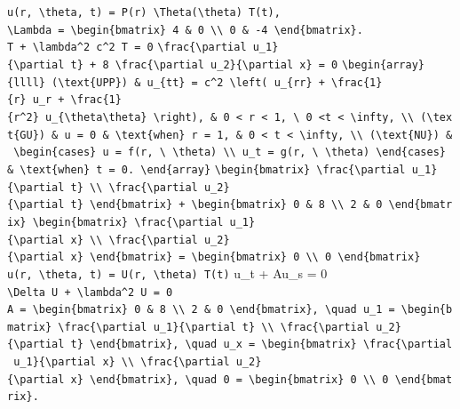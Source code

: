 \documentclass[
  ukrainian,
]{article}
\begin{document}
\texttt{u(r,\ \textbackslash{}theta,\ t)\ =\ P(r)\ \textbackslash{}Theta(\textbackslash{}theta)\ T(t),}
\texttt{\textbackslash{}Lambda\ =\ \textbackslash{}begin\{bmatrix\}\ 4\ \&\ 0\ \textbackslash{}\textbackslash{}\ 0\ \&\ -4\ \textbackslash{}end\{bmatrix\}.}
\texttt{T\textquotesingle{}\textquotesingle{}\ +\ \textbackslash{}lambda\^{}2\ c\^{}2\ T\ =\ 0}
\texttt{\textbackslash{}frac\{\textbackslash{}partial\ u\_1\}\{\textbackslash{}partial\ t\}\ +\ 8\ \textbackslash{}frac\{\textbackslash{}partial\ u\_2\}\{\textbackslash{}partial\ x\}\ =\ 0}
\texttt{\textbackslash{}begin\{array\}\{llll\}\ (\textbackslash{}text\{UPP\})\ \&\ u\_\{tt\}\ =\ c\^{}2\ \textbackslash{}left(\ u\_\{rr\}\ +\ \textbackslash{}frac\{1\}\{r\}\ u\_r\ +\ \textbackslash{}frac\{1\}\{r\^{}2\}\ u\_\{\textbackslash{}theta\textbackslash{}theta\}\ \textbackslash{}right),\ \&\ 0\ \textless{}\ r\ \textless{}\ 1,\ \textbackslash{}\ 0\ \textless{}t\ \textless{}\ \textbackslash{}infty,\ \textbackslash{}\textbackslash{}\ (\textbackslash{}text\{GU\})\ \&\ u\ =\ 0\ \&\ \textbackslash{}text\{when\}\ r\ =\ 1,\ \&\ 0\ \textless{}\ t\ \textless{}\ \textbackslash{}infty,\ \textbackslash{}\textbackslash{}\ (\textbackslash{}text\{NU\})\ \&\ \textbackslash{}begin\{cases\}\ u\ =\ f(r,\ \textbackslash{}\ \textbackslash{}theta)\ \textbackslash{}\textbackslash{}\ u\_t\ =\ g(r,\ \textbackslash{}\ \textbackslash{}theta)\ \textbackslash{}end\{cases\}\ \&\ \textbackslash{}text\{when\}\ t\ =\ 0.\ \textbackslash{}end\{array\}}
\texttt{\textbackslash{}begin\{bmatrix\}\ \textbackslash{}frac\{\textbackslash{}partial\ u\_1\}\{\textbackslash{}partial\ t\}\ \textbackslash{}\textbackslash{}\ \textbackslash{}frac\{\textbackslash{}partial\ u\_2\}\{\textbackslash{}partial\ t\}\ \textbackslash{}end\{bmatrix\}\ +\ \textbackslash{}begin\{bmatrix\}\ 0\ \&\ 8\ \textbackslash{}\textbackslash{}\ 2\ \&\ 0\ \textbackslash{}end\{bmatrix\}\ \textbackslash{}begin\{bmatrix\}\ \textbackslash{}frac\{\textbackslash{}partial\ u\_1\}\{\textbackslash{}partial\ x\}\ \textbackslash{}\textbackslash{}\ \textbackslash{}frac\{\textbackslash{}partial\ u\_2\}\{\textbackslash{}partial\ x\}\ \textbackslash{}end\{bmatrix\}\ =\ \textbackslash{}begin\{bmatrix\}\ 0\ \textbackslash{}\textbackslash{}\ 0\ \textbackslash{}end\{bmatrix\}}
\texttt{u(r,\ \textbackslash{}theta,\ t)\ =\ U(r,\ \textbackslash{}theta)\ T(t)}
u\_t + Au\_s = 0
\texttt{\textbackslash{}Delta\ U\ +\ \textbackslash{}lambda\^{}2\ U\ =\ 0}
\texttt{A\ =\ \textbackslash{}begin\{bmatrix\}\ 0\ \&\ 8\ \textbackslash{}\textbackslash{}\ 2\ \&\ 0\ \textbackslash{}end\{bmatrix\},\ \textbackslash{}quad\ u\_1\ =\ \textbackslash{}begin\{bmatrix\}\ \textbackslash{}frac\{\textbackslash{}partial\ u\_1\}\{\textbackslash{}partial\ t\}\ \textbackslash{}\textbackslash{}\ \textbackslash{}frac\{\textbackslash{}partial\ u\_2\}\{\textbackslash{}partial\ t\}\ \textbackslash{}end\{bmatrix\},\ \textbackslash{}quad\ u\_x\ =\ \textbackslash{}begin\{bmatrix\}\ \textbackslash{}frac\{\textbackslash{}partial\ u\_1\}\{\textbackslash{}partial\ x\}\ \textbackslash{}\textbackslash{}\ \textbackslash{}frac\{\textbackslash{}partial\ u\_2\}\{\textbackslash{}partial\ x\}\ \textbackslash{}end\{bmatrix\},\ \textbackslash{}quad\ 0\ =\ \textbackslash{}begin\{bmatrix\}\ 0\ \textbackslash{}\textbackslash{}\ 0\ \textbackslash{}end\{bmatrix\}.}
\end{document}
